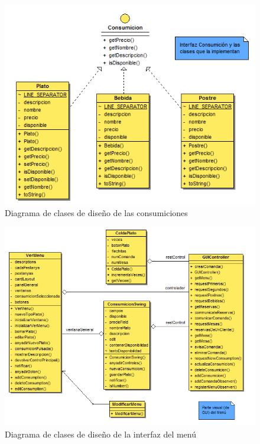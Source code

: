 \documentclass[spanish,a4paper,11pt, twoside]{report}	%
\begin{document}
		\begin{figure}[!h]
		\centering
		\includegraphics[scale=0.5]{DCDconsumicion.png}
		\caption{Diagrama de clases de diseño de las consumiciones}
		\end{figure}

		\begin{figure}[!h]
		\centering
		\includegraphics[scale=0.5]{DCDvistamenu.png}
		\caption{Diagrama de clases de diseño de la interfaz del menú }
		\end{figure}
\end{document}
